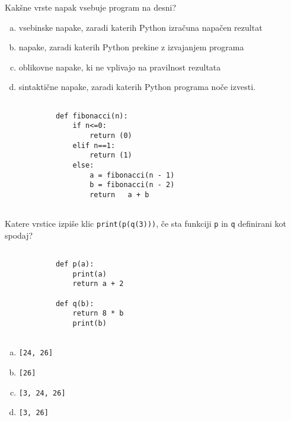 \documentclass[arhiv, 10pt]{../izpit}
\newcommand{\inlinepy}[1]{\texttt{#1}}
\begin{document}
        \naloga*
        \begin{multicols}{2}
        \noindent
        Kakšne vrste napak vsebuje program na desni?

        \begin{enumerate}[(a)]
\item vsebinske napake, zaradi katerih Python izračuna napačen rezultat
\item napake, zaradi katerih Python prekine z izvajanjem programa
\item oblikovne napake, ki ne vplivajo na pravilnost rezultata
\item sintaktične napake, zaradi katerih Python programa noče izvesti.
\end{enumerate}

        \columnbreak

        \begin{verbatim}
        
            def fibonacci(n):
                if n<=0:
                    return (0)
                elif n==1:
                    return (1)
                else:
                    a = fibonacci(n - 1)
                    b = fibonacci(n - 2)
                    return   a + b
            
        \end{verbatim}

        \end{multicols}

    
        \naloga*
        Katere vrstice izpiše klic \inlinepy{print(p(q(3)))}, če sta funkciji \inlinepy{p} in \inlinepy{q} definirani kot spodaj?

        \begin{multicols}{2}
        \begin{verbatim}
        
            def p(a):
                print(a)
                return a + 2

            def q(b):
                return 8 * b
                print(b)
        
        \end{verbatim}

        \begin{enumerate}[(a)]
\item \inlinepy{[24, 26]}
\item \inlinepy{[26]}
\item \inlinepy{[3, 24, 26]}
\item \inlinepy{[3, 26]}
\end{enumerate}

        \end{multicols}
    
\end{document}
